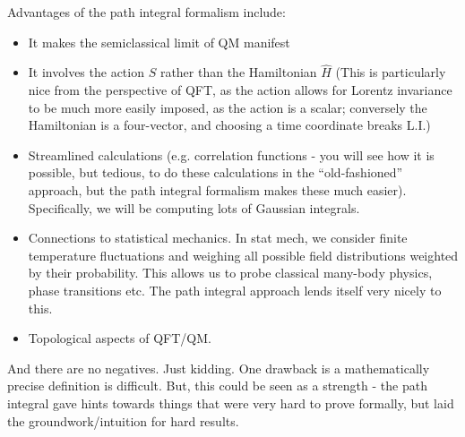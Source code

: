 Advantages of the path integral formalism include:
\begin{itemize}
    \item It makes the semiclassical limit of QM manifest
    \item It involves the action $S$ rather than the Hamiltonian $\hat{H}$ (This is particularly nice from the perspective of QFT, as the action allows for Lorentz invariance to be much more easily imposed, as the action is a scalar; conversely the Hamiltonian is a four-vector, and choosing a time coordinate breaks L.I.)
    \item Streamlined calculations (e.g. correlation functions - you will see how it is possible, but tedious, to do these calculations in the ``old-fashioned'' approach, but the path integral formalism makes these much easier). Specifically, we will be computing lots of Gaussian integrals.
    \item Connections to statistical mechanics. In stat mech, we consider finite temperature fluctuations and weighing all possible field distributions weighted by their probability. This allows us to probe classical many-body physics, phase transitions etc. The path integral approach lends itself very nicely to this.
    \item Topological aspects of QFT/QM.
\end{itemize}
And there are no negatives. Just kidding. One drawback is a mathematically precise definition is difficult. But, this could be seen as a strength - the path integral gave hints towards things that were very hard to prove formally, but laid the groundwork/intuition for hard results.

